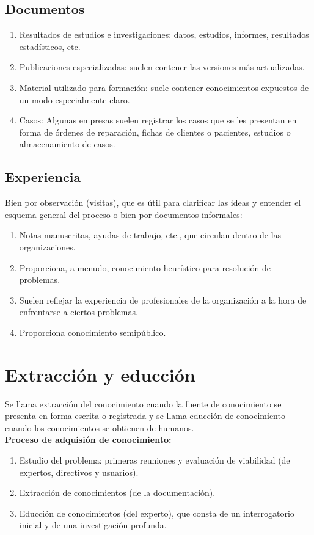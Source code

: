 \documentclass[12pt]{article}
\begin{document}
\subsection{Documentos}
\begin{enumerate}
\item Resultados de estudios e investigaciones: datos, estudios, informes, resultados estadísticos, etc.
\item Publicaciones especializadas: suelen contener las versiones más actualizadas.
\item Material utilizado para formación: suele contener conocimientos expuestos de un modo especialmente claro.
\item Casos: Algunas empresas suelen registrar los casos que se les presentan en forma de órdenes de reparación, fichas de clientes o pacientes, estudios o almacenamiento de casos.
\end{enumerate}

\subsection{Experiencia}
Bien por observación (visitas), que es útil para clarificar las ideas y entender el esquema general del proceso o bien por documentos informales:
\begin{enumerate}
\item Notas manuscritas, ayudas de trabajo, etc., que circulan dentro de las organizaciones.
\item Proporciona, a menudo, conocimiento heurístico para resolución de problemas.
\item Suelen reflejar la experiencia de profesionales de la organización a la hora de enfrentarse a ciertos problemas.
\item Proporciona conocimiento semipúblico.
\end{enumerate}

\section{Extracción y educción}
Se llama extracción del conocimiento cuando la fuente de conocimiento se presenta en forma escrita o registrada y se llama educción de conocimiento cuando los conocimientos se obtienen de humanos. \\ 

\textbf{Proceso de adquisión de conocimiento:}
\begin{enumerate}
\item Estudio del problema: primeras reuniones y evaluación de viabilidad (de expertos, directivos y usuarios).
\item Extracción de conocimientos (de la documentación).
\item Educción de conocimientos (del experto), que consta de un interrogatorio inicial y de una investigación profunda.
\end{enumerate}
\end{document}
